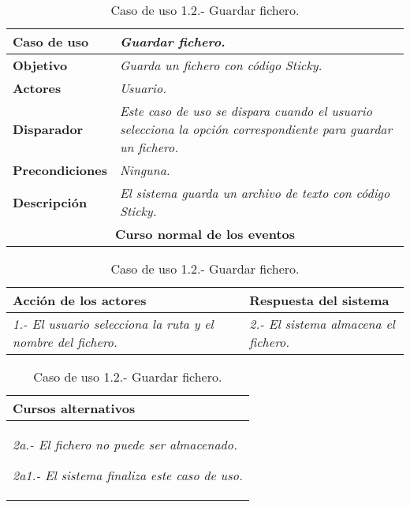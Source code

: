 \documentclass[twoside,a4paper,11pt]{book}
\begin{document}
\begin{table}[!ht]
    \centering
    \begin{tabular}{|p{4cm}|p{11.5cm}|}
    \hline

    \textbf{Caso de uso} & \textit{Guardar fichero.}\\
    \hline

    \textbf{Objetivo} & \textit{Guarda un fichero con código Sticky.}\\
    \hline

    \textbf{Actores} & \textit{Usuario.}\\
    \hline

    \textbf{Disparador} & \textit{Este caso de uso se dispara cuando el usuario selecciona la opción correspondiente para guardar un fichero.}\\
    \hline

    \textbf{Precondiciones} & \textit{Ninguna.}\\
    \hline

    \textbf{Descripción} & \textit{El sistema guarda un archivo de texto con código Sticky.}\\
    \hline

    \multicolumn{2}{|c|}{\textbf{Curso normal de los eventos}}\\
    \hline

    \end{tabular}
    \begin{tabular}{|p{7.75cm}|p{7.75cm}|}
    \hspace{2cm}\textbf{Acción de los actores} & \hspace{1.75cm}\textbf{Respuesta del sistema}\\
    \hline

    \textit{1.- El usuario selecciona la ruta y el nombre del fichero.}
    &
    \textit{2.- El sistema almacena el fichero.}
    \\
    \hline
    \end{tabular}

    \begin{tabular}{|p{15.9cm}|}
      \hspace{6cm}\textbf{Cursos alternativos}\\
      \hline
     
	\textit{2a.- El fichero no puede ser almacenado.}

	\textit{  2a1.- El sistema finaliza este caso de uso.}
      \\
      \hline
    \end{tabular}
    \caption{Caso de uso 1.2.- Guardar fichero.}
\end{table}
\end{document}

